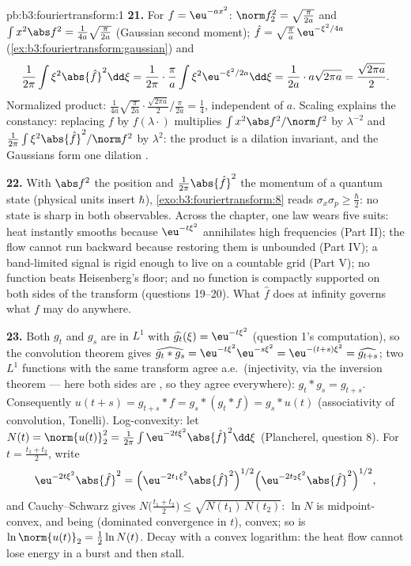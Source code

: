 \begin{solution}{pb:b3:fouriertransform:1}
\textbf{21.} For $f = \eu^{-ax^2}$: $\norm f_2^2 =
\sqrt{\frac\pi{2a}}$ and $\int x^2\abs f^2 =
\frac1{4a}\sqrt{\frac{\pi}{2a}}$ (Gaussian second moment);
$\hat f = \sqrt{\frac\pi a}\,\eu^{-\xi^2/4a}$
(\cref{ex:b3:fouriertransform:gaussian}) and
\[
\frac1{2\pi}\int\xi^2\abs{\hat f}^2\dd\xi =
\frac1{2\pi}\cdot\frac\pi a\int\xi^2
\eu^{-\xi^2/2a}\dd\xi = \frac1{2a}\cdot a\sqrt{2\pi a}
= \frac{\sqrt{2\pi a}}2 .
\]
Normalized product: $\frac1{4a}\sqrt{\frac\pi{2a}}\cdot
\frac{\sqrt{2\pi a}}2\big/\frac{\pi}{2a} = \frac14$,
independent of $a$. Scaling explains the constancy: replacing
$f$ by $f(\lambda\cdot)$ multiplies $\int x^2\abs f^2/\norm
f^2$ by $\lambda^{-2}$ and $\frac1{2\pi}\int\xi^2\abs{\hat
f}^2/\norm f^2$ by $\lambda^{2}$: the product is a dilation
invariant, and the Gaussians form one dilation .

\textbf{22.} With $\abs f^2$ the position  and
$\frac1{2\pi}\abs{\hat f}^2$ the momentum  of a
quantum state (physical units insert $\hbar$),
\cref{exo:b3:fouriertransform:8} reads $\sigma_x\sigma_p
\geq \frac\hbar2$: no state is sharp in both observables.
Across the chapter, one law wears five suits: heat instantly
smooths because $\eu^{-t\xi^2}$ annihilates high frequencies
(Part II); the flow cannot run backward because restoring
them is unbounded (Part IV); a band-limited signal is rigid
enough to live on a countable grid (Part V); no function
beats Heisenberg's floor; and no function is compactly
supported on both sides of the transform (questions 19--20).
What $\hat f$ does at infinity governs what $f$ may do
anywhere.

\textbf{23.} Both $g_t$ and $g_s$ are in $L^1$ with
$\widehat{g_t}(\xi) = \eu^{-t\xi^2}$ (question 1's
computation), so the convolution theorem gives
$\widehat{g_t * g_s} = \eu^{-t\xi^2}\eu^{-s\xi^2} =
\eu^{-(t+s)\xi^2} = \widehat{g_{t+s}}$; two $L^1$ functions
with the same transform agree a.e.\ (injectivity, via the
inversion theorem --- here both sides are , so
they agree everywhere): $g_t * g_s = g_{t+s}$. Consequently
$u(t + s) = g_{t+s} * f = g_s * (g_t * f) = g_s * u(t)$
(associativity of convolution, Tonelli). Log-convexity: let
$N(t) = \norm{u(t)}_2^2 = \frac1{2\pi}\int
\eu^{-2t\xi^2}\abs{\hat f}^2\dd\xi$ (Plancherel, question
8). For $t = \frac{t_1 + t_2}2$, write
\[
\eu^{-2t\xi^2}\abs{\hat f}^2
= \Bigl(\eu^{-2t_1\xi^2}\abs{\hat f}^2\Bigr)^{1/2}
\Bigl(\eu^{-2t_2\xi^2}\abs{\hat f}^2\Bigr)^{1/2},
\]
and Cauchy--Schwarz gives $N\bigl(\frac{t_1+t_2}2\bigr) \leq
\sqrt{N(t_1)\,N(t_2)}$: $\ln N$ is midpoint-convex, and
being  (dominated convergence in $t$), convex; so
is $\ln\norm{u(t)}_2 = \frac12\ln N(t)$. Decay with a convex
logarithm: the heat flow cannot lose energy in a burst and
then stall.


\end{solution}
